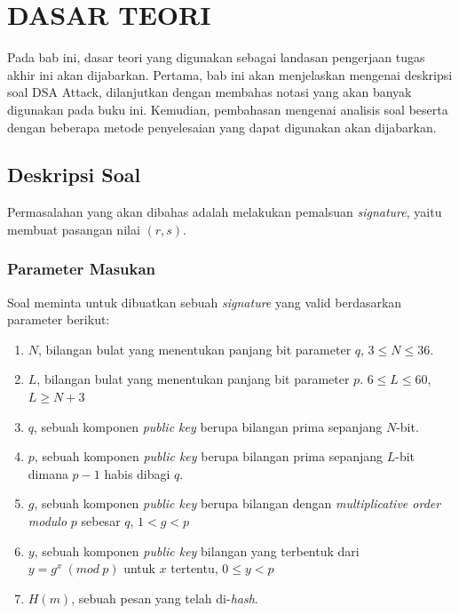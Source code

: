 \chapter {DASAR TEORI}

Pada bab ini, dasar teori yang digunakan sebagai landasan pengerjaan tugas akhir ini akan dijabarkan. Pertama, bab ini akan menjelaskan mengenai deskripsi soal DSA Attack, dilanjutkan dengan membahas notasi yang akan banyak digunakan pada buku ini. Kemudian, pembahasan mengenai analisis soal beserta dengan beberapa metode penyelesaian yang dapat digunakan akan dijabarkan.

\section{Deskripsi Soal}

Permasalahan yang akan dibahas adalah melakukan pemalsuan \textit{signature}, yaitu membuat pasangan nilai $ (r, s) $.

\subsection{Parameter Masukan}

Soal meminta untuk dibuatkan sebuah \textit{signature} yang valid berdasarkan parameter berikut:
\begin{enumerate}
	\item $ N $, bilangan bulat yang menentukan panjang bit parameter $ q $, $3 \leq N \leq 36$.
	\item $ L $, bilangan bulat yang menentukan panjang bit parameter $ p $. $6 \leq L \leq 60$, $L \geq N + 3$
	\item $ q $, sebuah komponen \textit{public key} berupa bilangan prima sepanjang $ N $-bit.
	\item $ p $, sebuah komponen \textit{public key} berupa bilangan prima sepanjang $ L $-bit dimana $ p-1 $ habis dibagi $ q $.
	\item $ g $, sebuah komponen \textit{public key} berupa bilangan dengan \textit{multiplicative order modulo} $ p $ sebesar $ q $, $1 < g < p$
	\item $ y $, sebuah komponen \textit{public key} bilangan yang terbentuk dari $ y = g^x\ (mod\ p) $ untuk $ x $ tertentu, $0 \leq y < p$
	\item $ H(m) $, sebuah pesan yang telah di-\textit{hash}.
\end{enumerate}


